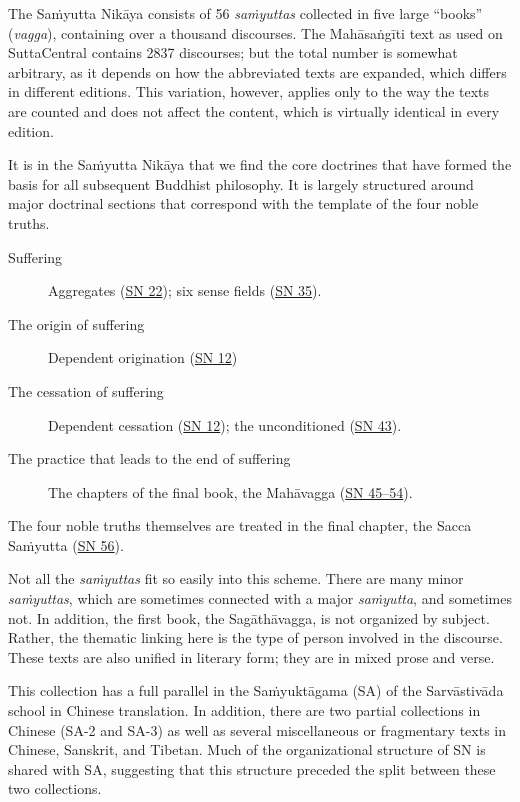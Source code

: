 \documentclass[12pt,openany]{book}%
\begin{document}
The \textsanskrit{Saṁyutta} \textsanskrit{Nikāya} consists of 56 \textit{\textsanskrit{saṁyuttas}} collected in five large “books” (\textit{vagga}), containing over a thousand discourses. The \textsanskrit{Mahāsaṅgīti} text as used on SuttaCentral contains 2837 discourses; but the total number is somewhat arbitrary, as it depends on how the abbreviated texts are expanded, which differs in different editions. This variation, however, applies only to the way the texts are counted and does not affect the content, which is virtually identical in every edition.

It is in the \textsanskrit{Saṁyutta} \textsanskrit{Nikāya} that we find the core doctrines that have formed the basis for all subsequent Buddhist philosophy. It is largely structured around major doctrinal sections that correspond with the template of the four noble truths.

\begin{description}%
\item[Suffering] Aggregates (\href{https://suttacentral.net/sn22}{SN 22}); six sense fields (\href{https://suttacentral.net/sn35}{SN 35}).%
\item[The origin of suffering] Dependent origination (\href{https://suttacentral.net/sn12}{SN 12})%
\item[The cessation of suffering] Dependent cessation (\href{https://suttacentral.net/sn12}{SN 12}); the unconditioned (\href{https://suttacentral.net/sn43}{SN 43}).%
\item[The practice that leads to the end of suffering] The chapters of the final book, the \textsanskrit{Mahāvagga} (\href{https://suttacentral.net/sn-mahavaggasamyutta}{SN 45–54}).%
\end{description}

The four noble truths themselves are treated in the final chapter, the Sacca \textsanskrit{Saṁyutta} (\href{https://suttacentral.net/sn56}{SN 56}).

Not all the \textit{\textsanskrit{saṁyuttas}} fit so easily into this scheme. There are many minor \textit{\textsanskrit{saṁyuttas}}, which are sometimes connected with a major \textit{\textsanskrit{saṁyutta}}, and sometimes not. In addition, the first book, the \textsanskrit{Sagāthāvagga}, is not organized by subject. Rather, the thematic linking here is the type of person involved in the discourse. These texts are also unified in literary form; they are in mixed prose and verse.

This collection has a full parallel in the \textsanskrit{Saṁyuktāgama} (SA) of the \textsanskrit{Sarvāstivāda} school in Chinese translation. In addition, there are two partial collections in Chinese (SA-2 and SA-3) as well as several miscellaneous or fragmentary texts in Chinese, Sanskrit, and Tibetan. Much of the organizational structure of SN is shared with SA, suggesting that this structure preceded the split between these two collections.
\end{document}

